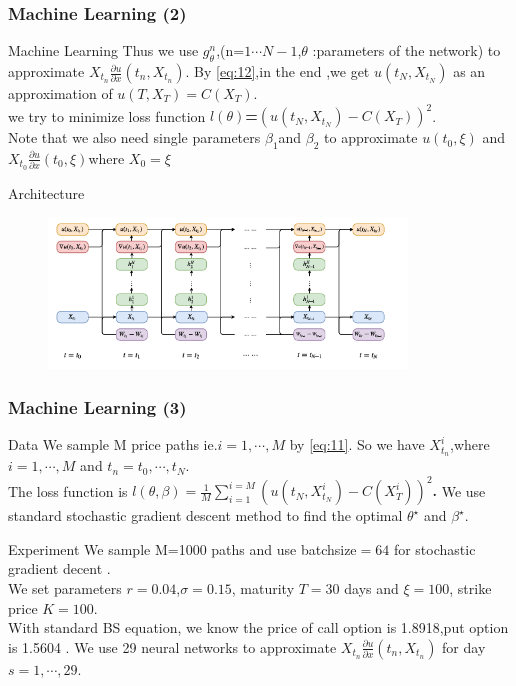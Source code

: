 \documentclass[mathserif,10pt]{beamer}
\renewcommand{\alert}[1]{\textcolor{MyRed}{#1}\xspace}
\renewcommand{\emph}[1]{\textbf{#1}\xspace}
\begin{document}
\begin{frame}
\frametitle{Machine Learning (2)}
\begin{block}{Machine Learning}
Thus we use $g_\theta^n$,(n=$1\cdots N-1$,$\theta$ :parameters of the network) to approximate $X_{t_n}\frac{\partial u}{\partial x}(t_n,X_{t_n})$.
By \eqref{eq:12},in the end ,we get $u(t_N,X_{t_N})$ as an approximation of $u(T,X_T)=C(X_T)$.\\
we try to minimize loss function 
\emph{\alert{$l(\theta)$=$(u(t_N,X_{t_N})-C(X_T))^2$}}.\\
Note that we also need single parameters $\beta_1$and $\beta_2$ to approximate $u(t_0,\xi)$ and $X_{t_0}\frac{\partial u}{\partial x}(t_0,\xi)$where $X_0=\xi$
\end{block}
\begin{block}{Architecture}
\vspace{-2em}
\begin{figure}
\includegraphics[width=1.0\linewidth, height=4cm]{graphics/arch.png}
\end{figure}
\end{block}
\end{frame}




\begin{frame}
\frametitle{Machine Learning (3)}
\begin{block}{Data}
We sample M price paths  ie.$i=1,\cdots,M$ by \eqref{eq:11}. So we have $X_{t_n}^i$,where $i=1,\cdots,M$  and $t_n=t_0,\cdots,t_N$.\\
The loss function is 
\emph{\alert{$l(\theta,\beta)=\frac{1}{M}\sum_{i=1}^{i=M}(u(t_N,X_{t_N}^i)-C(X_T^i))^2$.}}
We use standard stochastic gradient descent method to find the optimal $\theta^\star$ and $\beta^\star$.
\end{block}
\begin{block}{Experiment }
We sample M=1000 paths and use batchsize$=64$ for  stochastic gradient decent .\\
We set parameters $r=0.04$,$\sigma=0.15$, maturity $T=30$ days and $\xi=100$, strike price $K=100$.\\
With standard BS equation, we know the price of call option is 1.8918,put option is 1.5604 .
%
We use 29 neural networks to approximate $X_{t_n}\frac{\partial u}{\partial x}(t_n,X_{t_n})$ 
for day$s=1,\cdots,29$.
\end{block}
\end{frame}
\end{document}
